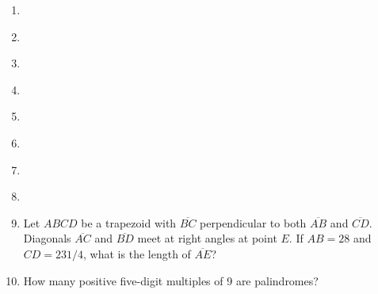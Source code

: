 \documentclass{article}
\begin{document}
\begin{enumerate}
\item \underline{\hspace{3in}}\vspace{1cm}
\item \underline{\hspace{3in}}\vspace{1cm}
\item \underline{\hspace{3in}}\vspace{1cm}
\item \underline{\hspace{3in}}\vspace{1cm}
\item \underline{\hspace{3in}}\vspace{1cm}
\item \underline{\hspace{3in}}\vspace{1cm}
\item \underline{\hspace{3in}}\vspace{1cm}
\item \underline{\hspace{3in}}\vspace{1cm}
\item Let $ABCD$ be a trapezoid with $\overline{BC}$ perpendicular to both $\overline{AB}$ and $\overline{CD}$. Diagonals $\overline{AC}$ and $\overline{BD}$ meet at right angles at point $E$. If $AB = 28$ and $CD = 231/4$, what is the length of $\overline{AE}$?
\vspace{1cm}
\item How many positive five-digit multiples of 9 are palindromes?
\end{enumerate}
\end{document}
